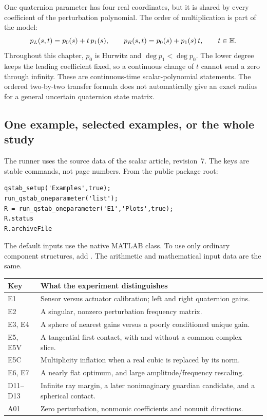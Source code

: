 One quaternion parameter has four real coordinates, but it is shared by
every coefficient of the perturbation polynomial. The order of multiplication
is part of the model:
\[
 p_L(s,t)=p_0(s)+t\,p_1(s),\qquad
 p_R(s,t)=p_0(s)+p_1(s)\,t,\qquad t\in\mathbb H.
\]
Throughout this chapter, $p_0$ is Hurwitz and
$\deg p_1<\deg p_0$. The lower degree keeps the leading coefficient fixed,
so a continuous change of $t$ cannot send a zero through infinity.
These are continuous-time scalar-polynomial statements. The ordered
two-by-two transfer formula does not automatically give an exact radius
for a general uncertain quaternion state matrix.

\subsection{One example, selected examples, or the whole study}
The runner uses the source data of the scalar article, revision~7.
The keys are stable commands, not page numbers. From the public package root:
\begin{lstlisting}
qstab_setup('Examples',true);
run_qstab_oneparameter('list');
R = run_qstab_oneparameter('E1','Plots',true);
R.status
R.archiveFile
\end{lstlisting}
The default inputs use the native MATLAB  class. To use only
ordinary component structures, add . The arithmetic
and mathematical input data are the same.

\begin{tabularx}{\linewidth}{@{}p{.15\linewidth}Y@{}}\toprule
Key & What the experiment distinguishes\\\midrule
E1 & Sensor versus actuator calibration; left and right quaternion gains.\\
E2 & A singular, nonzero perturbation frequency matrix.\\
E3, E4 & A sphere of nearest gains versus a poorly conditioned unique gain.\\
E5, E5V & A tangential first contact, with and without a common complex slice.\\
E5C & Multiplicity inflation when a real cubic is replaced by its norm.\\
E6, E7 & A nearly flat optimum, and large amplitude/frequency rescaling.\\
D11--D13 & Infinite ray margin, a later nonimaginary guardian candidate,
and a spherical contact.\\
A01 & Zero perturbation, nonmonic coefficients and nonunit directions.\\\bottomrule
\end{tabularx}


